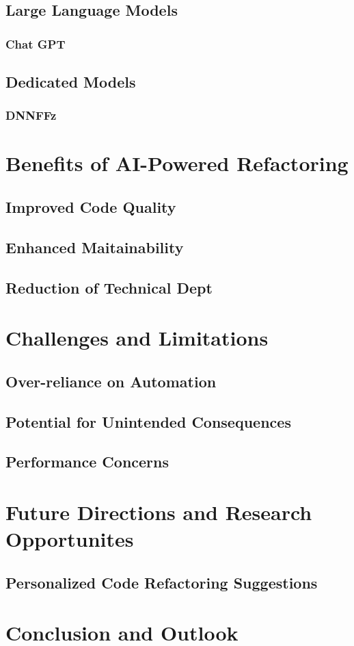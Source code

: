 \documentclass[conference]{IEEEtran}
\begin{document}
\subsection{Large Language Models}
\subsubsection{Chat GPT}
\subsection{Dedicated Models}
\subsubsection{DNNFFz}

\section{Benefits of AI-Powered Refactoring}
\subsection{Improved Code Quality}
\subsection{Enhanced Maitainability}
\subsection{Reduction of Technical Dept}

\section{Challenges and Limitations}
\subsection{Over-reliance on Automation}
\subsection{Potential for Unintended Consequences}
\subsection{Performance Concerns}

\section{Future Directions and Research Opportunites}
\subsection{Personalized Code Refactoring Suggestions}

\section{Conclusion and Outlook}

\nocite{*} %
\end{document}
